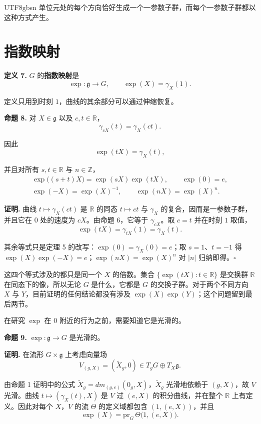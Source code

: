 \documentclass[11pt]{article}
\begin{document}
\begin{CJK*}{UTF8}{gbsn}
单位元处的每个方向恰好生成一个一参数子群，而每个一参数子群都以这种方式产生。

\section{指数映射}

\textbf{定义 7.} $G$ 的\textbf{指数映射}是
\[
\exp : \mathfrak{g} \to G, \qquad \exp(X) = \gamma_X(1).
\]

定义只用到时刻 $1$，曲线的其余部分可以通过伸缩恢复。

\textbf{命题 8.} 对 $X \in \mathfrak{g}$ 以及 $c, t \in \mathbb{R}$，
\[
\gamma_{cX}(t) = \gamma_X(ct).
\]

因此
\[
\boxed{\exp(tX) = \gamma_X(t)},
\]

并且对所有 $s, t \in \mathbb{R}$ 与 $n \in \mathbb{Z}$，
\[
\begin{gathered}
\exp\bigl((s + t)X\bigr) = \exp(sX) \exp(tX), \qquad \exp(0) = e, \\
\exp(-X) = \exp(X)^{-1}, \qquad \exp(nX) = \exp(X)^n.
\end{gathered}
\]

\textbf{证明.} 曲线 $t \mapsto \gamma_X(ct)$ 是 $\mathbb{R}$ 的同态 $t \mapsto ct$ 与 $\gamma_X$ 的复合，因而是一参数子群，并且它在 $0$ 处的速度为 $cX$。由命题 6，它等于 $\gamma_{cX}$。取 $c = t$ 并在时刻 $1$ 取值，
\[
\exp(tX) = \gamma_{tX}(1) = \gamma_X(t).
\]

其余等式只是定理 5 的改写：$\exp(0) = \gamma_X(0) = e$；取 $s = 1$、$t = -1$ 得 $\exp(X)\exp(-X) = e$；$\exp(nX) = \exp(X)^n$ 对 $|n|$ 归纳即得。$\square$

这四个等式涉及的都只是同一个 $X$ 的倍数。集合 $\{\exp(tX) : t \in \mathbb{R}\}$ 是交换群 $\mathbb{R}$ 在同态下的像，所以无论 $G$ 是什么，它都是 $G$ 的交换子群。对于两个不同方向 $X$ 与 $Y$，目前证明的任何结论都没有涉及 $\exp(X)\exp(Y)$；这个问题留到最后两节。

在研究 $\exp$ 在 $0$ 附近的行为之前，需要知道它是光滑的。

\textbf{命题 9.} $\exp : \mathfrak{g} \to G$ 是光滑的。

\textbf{证明.} 在流形 $G \times \mathfrak{g}$ 上考虑向量场
\[
V_{(g, X)} = (\widetilde{X}_g, 0) \in T_gG \oplus T_X\mathfrak{g}.
\]

由命题 1 证明中的公式 $\widetilde{X}_g = dm_{(g, e)}(0_g, X)$，$\widetilde{X}_g$ 光滑地依赖于 $(g, X)$，故 $V$ 光滑。曲线 $t \mapsto (\gamma_X(t), X)$ 是 $V$ 过 $(e, X)$ 的积分曲线，并在整个 $\mathbb{R}$ 上有定义。因此对每个 $X$，$V$ 的流 $\Theta$ 的定义域都包含 $(1, (e, X))$，并且
\[
\exp(X) = \mathrm{pr}_G\, \Theta\bigl(1, (e, X)\bigr).
\]


\end{CJK*}
\end{document}

